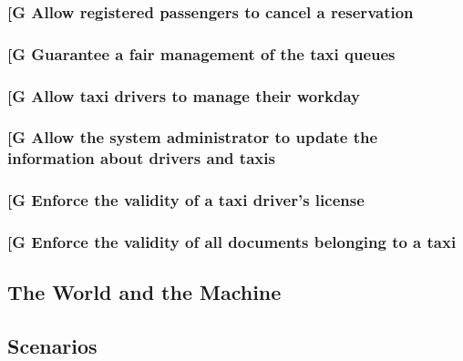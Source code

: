 \documentclass[a4paper,12pt]{article}%
\newcounter{goals_counter}
\begin{document}
\subsubsection{\label{goal\arabic{goals_counter}}{[}G\arabic{goals_counter}{]} Allow registered passengers to cancel a reservation}
\subsubsection{\label{goal\arabic{goals_counter}}{[}G\arabic{goals_counter}{]} Guarantee a fair management of the taxi queues}
\subsubsection{\label{goal\arabic{goals_counter}}{[}G\arabic{goals_counter}{]} Allow taxi drivers to manage their workday}
\subsubsection{\label{goal\arabic{goals_counter}}{[}G\arabic{goals_counter}{]} Allow the system administrator to update the information about drivers and taxis}
\subsubsection{\label{goal\arabic{goals_counter}}{[}G\arabic{goals_counter}{]} Enforce the validity of a taxi driver's license}
\subsubsection{\label{goal\arabic{goals_counter}}{[}G\arabic{goals_counter}{]} Enforce the validity of all  documents belonging to a taxi}
\subsection{The World and the Machine}
\subsection{Scenarios}
\end{document}
